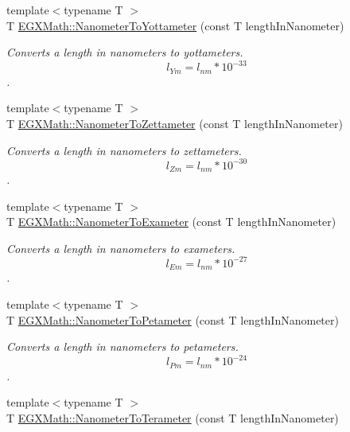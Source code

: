 \begin{DoxyCompactItemize}
{\footnotesize template$<$typename T $>$ }\\T \mbox{\hyperlink{group___e_g_x_math-_conversions-_length_conversions-_s_i-_nanometer-_s_i_ga986e80d7ab490fdc59ebbc2d7473bda3}{E\+G\+X\+Math\+::\+Nanometer\+To\+Yottameter}} (const T length\+In\+Nanometer)
\begin{DoxyCompactList}\small\item\em Converts a length in nanometers to yottameters. \[ l_{Ym}=l_{nm} * 10^{-33} \]. \end{DoxyCompactList}\item 
{\footnotesize template$<$typename T $>$ }\\T \mbox{\hyperlink{group___e_g_x_math-_conversions-_length_conversions-_s_i-_nanometer-_s_i_ga3306731dd581f22ad9203923e4a03d2a}{E\+G\+X\+Math\+::\+Nanometer\+To\+Zettameter}} (const T length\+In\+Nanometer)
\begin{DoxyCompactList}\small\item\em Converts a length in nanometers to zettameters. \[ l_{Zm}=l_{nm} * 10^{-30} \]. \end{DoxyCompactList}\item 
{\footnotesize template$<$typename T $>$ }\\T \mbox{\hyperlink{group___e_g_x_math-_conversions-_length_conversions-_s_i-_nanometer-_s_i_ga27316ac700548a2bcf058bb4f098f4e2}{E\+G\+X\+Math\+::\+Nanometer\+To\+Exameter}} (const T length\+In\+Nanometer)
\begin{DoxyCompactList}\small\item\em Converts a length in nanometers to exameters. \[ l_{Em}=l_{nm} * 10^{-27} \]. \end{DoxyCompactList}\item 
{\footnotesize template$<$typename T $>$ }\\T \mbox{\hyperlink{group___e_g_x_math-_conversions-_length_conversions-_s_i-_nanometer-_s_i_ga61c4ec1200cb2e909920c108d676d6e6}{E\+G\+X\+Math\+::\+Nanometer\+To\+Petameter}} (const T length\+In\+Nanometer)
\begin{DoxyCompactList}\small\item\em Converts a length in nanometers to petameters. \[ l_{Pm}=l_{nm} * 10^{-24} \]. \end{DoxyCompactList}\item 
{\footnotesize template$<$typename T $>$ }\\T \mbox{\hyperlink{group___e_g_x_math-_conversions-_length_conversions-_s_i-_nanometer-_s_i_gacca577403e34659fd6bccf40885704fc}{E\+G\+X\+Math\+::\+Nanometer\+To\+Terameter}} (const T length\+In\+Nanometer)

\end{DoxyCompactItemize}
